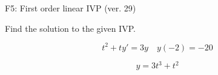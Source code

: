 \begin{exercise}
  \begin{exerciseTitle}F5: First order linear IVP (ver. 29)\end{exerciseTitle}
  \begin{exerciseStatement}
    
Find the solution to the given IVP.

    
\[t^{2} +ty'= 3 y \hspace{1em} y( -2 ) = -20\]

  \end{exerciseStatement}
  \begin{exerciseAnswer}
    
\[y= 3 t^ 3 + t^{2}\]

  \end{exerciseAnswer}
\end{exercise}